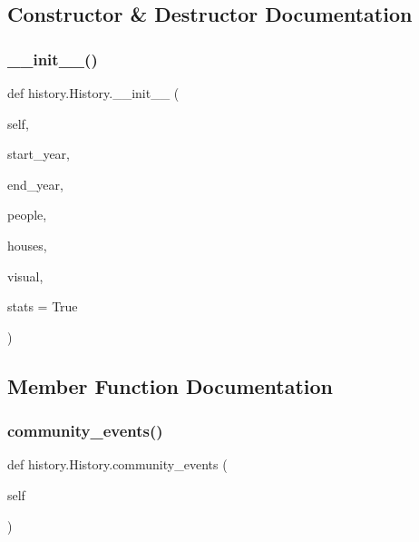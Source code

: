 \subsection{Constructor \& Destructor Documentation}
\mbox{\label{classhistory_1_1History_a48dd0ddcbaa81df5c504b853efe38369}} 
\subsubsection{\texorpdfstring{\+\_\+\+\_\+init\+\_\+\+\_\+()}{\_\_init\_\_()}}
{\footnotesize\ttfamily def history.\+History.\+\_\+\+\_\+init\+\_\+\+\_\+ (\begin{DoxyParamCaption}\item[{}]{self,  }\item[{}]{start\+\_\+year,  }\item[{}]{end\+\_\+year,  }\item[{}]{people,  }\item[{}]{houses,  }\item[{}]{visual,  }\item[{}]{stats = {\ttfamily True} }\end{DoxyParamCaption})}



\subsection{Member Function Documentation}
\mbox{\label{classhistory_1_1History_a357b1ce764d10959ac6ae9880d4192ec}} 
\subsubsection{\texorpdfstring{community\+\_\+events()}{community\_events()}}
{\footnotesize\ttfamily def history.\+History.\+community\+\_\+events (\begin{DoxyParamCaption}\item[{}]{self }\end{DoxyParamCaption})}

